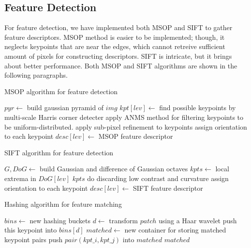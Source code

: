 \documentclass[11pt]{article}
\begin{document}
\subsection{Feature Detection}
For feature detection, we have implemented both MSOP and SIFT to gather feature descriptors. MSOP method is easier to be implemented; though, it neglects keypoints that are near the edges, which cannot retreive sufficient amount of pixels for constructing descriptors. SIFT is intricate, but it brings about better performance. Both MSOP and SIFT algorithms are shown in the following paragraphs.
\begin{algorithm}
\caption{MSOP algorithm for feature detection \cite{ref:msop}}
\begin{algorithmic}
  \State $pyr \gets$ build gaussian pyramid of $img$ 
      \State $kpt[lev]\gets$ find possible keypoints by multi-scale Harris corner detecter
      \State apply ANMS method for filtering keypoints to be uniform-distributed.
      \State apply sub-pixel refinement to keypoints
      \State assign orientation to each keypoint
      \State $desc[lev]\gets$ MSOP feature descriptor
    \EndFor
  \EndFor
\EndFunction
\end{algorithmic}
\end{algorithm}

\begin{algorithm}
\caption{SIFT algorithm for feature detection \cite{ref:sift}}
\begin{algorithmic}
  \State $G, DoG\gets$ build Gaussian and difference of Gaussian octaves
    \State $kpts\gets$ local extrema in $DoG[lev]$
    \State $kpts$ do discarding low contrast and curvature
    \State assign orientation to each keypoint
    \State $desc[lev]\gets$ SIFT feature descriptor
    \EndFor
  \EndFor
\EndFunction
\end{algorithmic}
\end{algorithm}

\begin{algorithm}
\caption{Hashing algorithm for feature matching}
\begin{algorithmic}
  \State $bins\gets$ new hashing buckets
        \State $d\gets$ transform $patch$ using a Haar wavelet
        \State push this keypoint into $bins[d]$
      \EndFor
    \EndFor
  \EndFor
  \State $matched\gets$ new container for storing matched keypoint pairs
        \State push $pair(kpt\_i, kpt\_j)$ into $matched$
      \EndIf
    \EndFor
  \EndFor
  \State\Return $matched$
\EndFunction
\end{algorithmic}
\end{algorithm}
\end{document}

